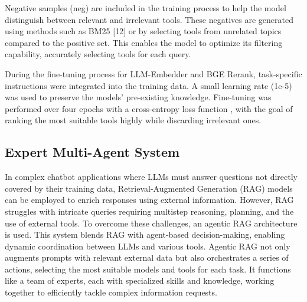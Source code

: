 \documentclass[runningheads]{llncs}
\begin{document}
Negative samples (neg) are included in the training process to help the model distinguish between relevant and irrelevant tools. These negatives are generated using methods such as BM25 [12] or by selecting tools from unrelated topics compared to the positive set. This enables the model to optimize its filtering capability, accurately selecting tools for each query.

During the fine-tuning process for LLM-Embedder and BGE Rerank, task-specific instructions were integrated into the training data. A small learning rate (1e-5) was used to preserve the models' pre-existing knowledge. Fine-tuning was performed over four epochs with a cross-entropy loss function \cite{10.5555/3618408.3619400}, with the goal of ranking the most suitable tools highly while discarding irrelevant ones.

\subsection{Expert Multi-Agent System}
In complex chatbot applications where LLMs must answer questions not directly covered by their training data, Retrieval-Augmented Generation (RAG) models \cite{10.1145/3637528.3671470} can be employed to enrich responses using external information. However, RAG struggles with intricate queries requiring multistep reasoning, planning, and the use of external tools. To overcome these challenges, an agentic RAG architecture \cite{agentic_rag} is used. This system blends RAG with agent-based decision-making, enabling dynamic coordination between LLMs and various tools. Agentic RAG not only augments prompts with relevant external data but also orchestrates a series of actions, selecting the most suitable models and tools for each task. It functions like a team of experts, each with specialized skills and knowledge, working together to efficiently tackle complex information requests.
\end{document}
